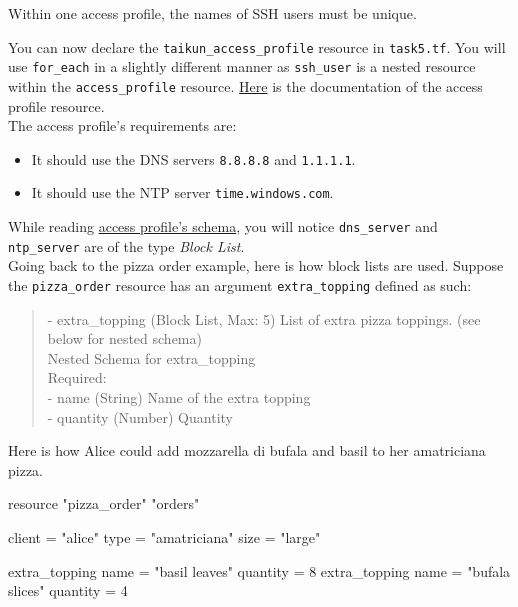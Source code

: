 \begin{warn}
Within one access profile, the names of SSH users must be unique.
\end{warn}

You can now declare the \texttt{taikun\_access\_profile} resource in \texttt{task5.tf}.
You will use \texttt{for\_each} in a slightly different manner as \texttt{ssh\_user} is a nested resource
within the \texttt{access\_profile} resource.
\href{https://intuinewin.github.io/taikun-docs/resources/access_profile.html}{Here}
is the documentation of the access profile resource.\\

The access profile's requirements are:
\begin{itemize}
  \item It should use the DNS servers \texttt{8.8.8.8} and \texttt{1.1.1.1}.
  \item It should use the NTP server \texttt{time.windows.com}.
\end{itemize}

\begin{tip}
While reading \href{https://intuinewin.github.io/taikun-docs/resources/access_profile.html}{access profile's schema},
you will notice \texttt{dns\_server} and \texttt{ntp\_server} are of the type \textit{Block List}.\\

Going back to the pizza order example, here is how block lists are used.
Suppose the \texttt{pizza\_order} resource has an argument \texttt{extra\_topping} defined as such:
\begin{quote}
- extra\_topping (Block List, Max: 5) List of extra pizza toppings. (see below for nested schema)\\

Nested Schema for extra\_topping\\
Required:\\
- name (String) Name of the extra topping\\
- quantity (Number) Quantity
\end{quote}
Here is how Alice could add mozzarella di bufala and basil to her amatriciana pizza.
\begin{tf}
resource "pizza_order" "orders" {
  client = "alice"
  type   = "amatriciana"
  size   = "large"

  extra_topping {
    name = "basil leaves"
    quantity = 8
  }
  extra_topping {
    name = "bufala slices"
    quantity = 4
  }
}
\end{tf}
\end{tip}
